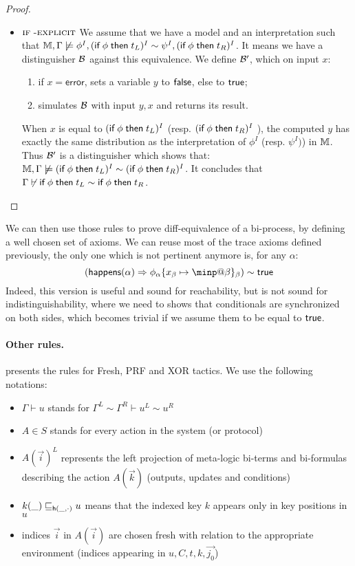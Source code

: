 \begin{proof}
  \begin{itemize}
    \item $\textsc{\textsf{if}\;-explicit}$
      We assume that we have a model and an interpretation such that
      $\mathbb{M},\Gamma \not \models  \phi^I, (\textsf{if}\;  \phi \;\textsf{then}\; t_L)^I \sim \psi^I, (\textsf{if}\; \phi \;\textsf{then}\; t_R)^I $.
      It means we have a distinguisher $\mathcal{B}$ against this equivalence.
      We define $\mathcal{B}'$, which on input $x$:
      \begin{enumerate}
      \item if $x = \mathsf{error}$, sets a variable $y$ to $\textsf{false}$, else to $\textsf{true}$;
      \item simulates $\mathcal{B}$ with input $y,x$ and returns its result.
      \end{enumerate}
      When $x$ is equal to $(\textsf{if}\; \phi \;\textsf{then}\; t_L)^I $ (resp. $(\textsf{if}\; \phi \;\textsf{then}\; t_R)^I$ ), the computed $y$ has exactly the same distribution as the interpretation of $\phi^I$ (resp. $\psi^I)$) in $\mathbb{M}$.
      Thus $\mathcal{B}'$ is a distinguisher which shows that:
    $\mathbb{M},\Gamma \not \models (\textsf{if}\;  \phi \;\textsf{then}\; t_L)^I \sim  (\textsf{if}\; \phi \;\textsf{then}\; t_R)^I $.
      It concludes that $\Gamma \not \vdash \textsf{if}\;  \phi \;\textsf{then}\; t_L \sim \textsf{if}\;  \phi \;\textsf{then}\; t_R$.

    \end{itemize}
\end{proof}


We can then use those rules to prove diff-equivalence of a bi-process, by defining a well chosen set of axioms. We can reuse most of the trace axioms defined previously, the only one which is not pertinent anymore is, for any $\alpha$:
\[   (\happens(\alpha) \Rightarrow
  \phi_\alpha\{x_\beta\mapsto\minp@\beta\}_\beta) \sim \true\]
Indeed, this version is useful and sound for reachability, but is not sound for indistinguishability, where we need to shows that conditionals are synchronized on both sides, which becomes trivial if we assume them to be equal to $\textsf{true}$.

\paragraph{Other rules.}

 presents the rules for Fresh, PRF and XOR tactics.
We use the following notations:
\begin{itemize}
  \item $\Gamma \vdash u$ stands for $\Gamma^L \sim \Gamma^R \vdash u^L \sim u^R$
  \item $A \in S$ stands for every action in the system (or protocol)
  \item $A(\vec i)^L$ represents the left projection of meta-logic bi-terms and bi-formulas describing the action $A(\vec k)$ (outputs, updates and conditions)
  \item $k(\_) \sqsubseteq_{\mathsf{h}(\_,\cdot)} u$ means that the indexed key $k$ appears only in key positions in $u$
  \item indices $\vec i$ in $A(\vec i)$ are chosen fresh with relation to the appropriate environment (\ie indices appearing in $u, C, t, k, \vec {j_0}$)
\end{itemize}

